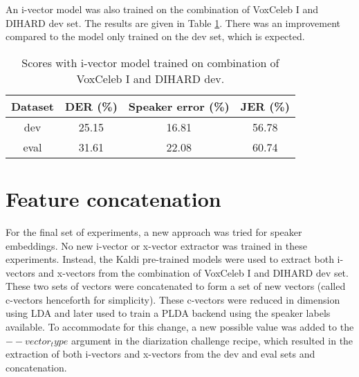 		An i-vector model was also trained on the combination of VoxCeleb I and DIHARD dev set. The results are given in Table \ref{table-voxdev-ivec}. There was an improvement compared to the model only trained on the dev set, which is expected.
		
		\begin{table}[h]
			\centering
			\begin{tabular}{|c|c|c|c|}
				\hline
				Dataset & DER (\%) & Speaker error (\%) & JER (\%) \\
				\hline
				dev & 25.15 & 16.81 & 56.78 \\
				\hline
				eval & 31.61 & 22.08 & 60.74 \\
				\hline
			\end{tabular}
			\caption{Scores with i-vector model trained on combination of VoxCeleb I and DIHARD dev.}
			\label{table-voxdev-ivec}
		\end{table}
		
	\section{Feature concatenation}
	For the final set of experiments, a new approach was tried for speaker embeddings. No new i-vector or x-vector extractor was trained in these experiments. Instead, the Kaldi pre-trained models were used to extract both i-vectors and x-vectors from the combination of VoxCeleb I and DIHARD dev set. These two sets of vectors were concatenated to form a set of new vectors (called c-vectors henceforth for simplicity). These c-vectors were reduced in dimension using LDA and later used to train a PLDA backend using the speaker labels available. To accommodate for this change, a new possible value was added to the $--vector_type$ argument in the diarization challenge recipe, which resulted in the extraction of both i-vectors and x-vectors from the dev and eval sets and concatenation.
	
